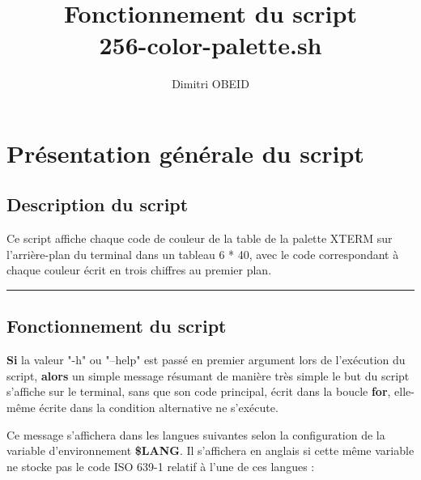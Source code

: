 \documentclass[a4paper,10pt]{article}
\title{\color{sec1}Fonctionnement du script\\ \textbf{\color{sec2}256-color-palette.sh}}\color{text}
\author{Dimitri OBEID}
\begin{document}
    \maketitle
    \newpage

    \hypertarget{contents}{}
    \tableofcontents
    \newpage

    \color{sec1}
    \section{Présentation générale du script}\color{text}

    \color{sec2}
    \subsection{Description du script}\color{text}

    \begin{justify}
        Ce script affiche chaque code de couleur de la table de la palette XTERM sur l'arrière-plan du terminal dans un tableau 6 * 40, avec le code correspondant à chaque couleur écrit en trois chiffres au premier plan.
    \end{justify}




    \color{sec2}\par\noindent\rule{\textwidth}{0.4pt}\color{text}

    \color{sec2}
    \subsection{Fonctionnement du script}\color{text}

    \begin{justify}
        \textbf{\color{cond}Si} la valeur "-h" ou "--help" est passé en premier argument lors de l'exécution du script, \textbf{\color{cond}alors} un simple message résumant de manière très simple le but du script s'affiche sur le terminal, sans que son code principal, écrit dans la boucle \textbf{\color{loop}for}, elle-même écrite dans la condition alternative ne s'exécute.
    \end{justify}

    \begin{justify}
        Ce message s'affichera dans les langues suivantes selon la configuration de la variable d'environnement \textbf{\color{vars}\$LANG}. Il s'affichera en anglais si cette même variable ne stocke pas le code ISO 639-1 relatif à l'une de ces langues :
    \end{justify}
\end{document}
